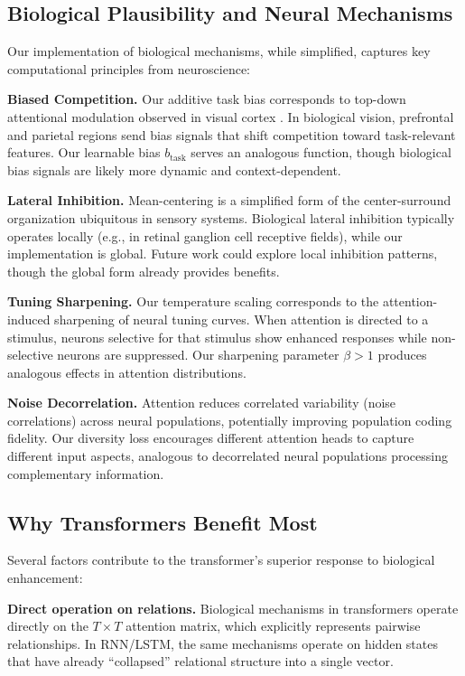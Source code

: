 \subsection{Biological Plausibility and Neural Mechanisms}

Our implementation of biological mechanisms, while simplified, captures key computational principles from neuroscience:

\textbf{Biased Competition.} Our additive task bias corresponds to top-down attentional modulation observed in visual cortex \cite{desimone1995neural}. In biological vision, prefrontal and parietal regions send bias signals that shift competition toward task-relevant features. Our learnable bias $b_{\text{task}}$ serves an analogous function, though biological bias signals are likely more dynamic and context-dependent.

\textbf{Lateral Inhibition.} Mean-centering is a simplified form of the center-surround organization ubiquitous in sensory systems. Biological lateral inhibition typically operates locally (e.g., in retinal ganglion cell receptive fields), while our implementation is global. Future work could explore local inhibition patterns, though the global form already provides benefits.

\textbf{Tuning Sharpening.} Our temperature scaling corresponds to the attention-induced sharpening of neural tuning curves. When attention is directed to a stimulus, neurons selective for that stimulus show enhanced responses while non-selective neurons are suppressed. Our sharpening parameter $\beta > 1$ produces analogous effects in attention distributions.

\textbf{Noise Decorrelation.} Attention reduces correlated variability (noise correlations) across neural populations, potentially improving population coding fidelity. Our diversity loss encourages different attention heads to capture different input aspects, analogous to decorrelated neural populations processing complementary information.

\subsection{Why Transformers Benefit Most}

Several factors contribute to the transformer's superior response to biological enhancement:

\textbf{Direct operation on relations.} Biological mechanisms in transformers operate directly on the $T \times T$ attention matrix, which explicitly represents pairwise relationships. In RNN/LSTM, the same mechanisms operate on hidden states that have already ``collapsed'' relational structure into a single vector.

